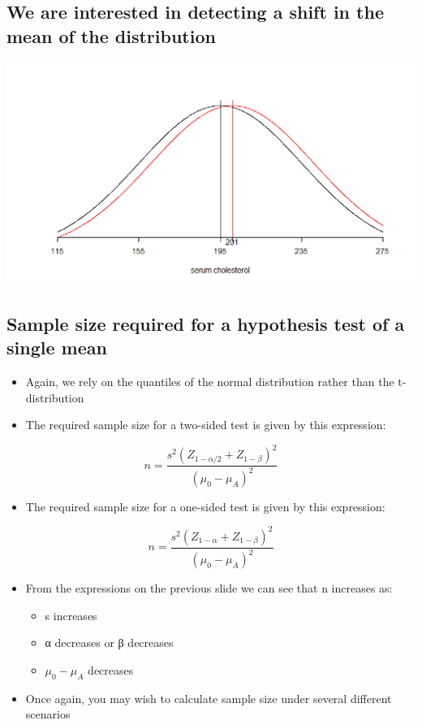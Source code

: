\documentclass[
]{book}
\providecommand{\tightlist}{%
  \setlength{\itemsep}{0pt}\setlength{\parskip}{0pt}}
\begin{document}
\hypertarget{we-are-interested-in-detecting-a-shift-in-the-mean-of-the-distribution}{%
\subsection{We are interested in detecting a shift in the mean of the distribution}\label{we-are-interested-in-detecting-a-shift-in-the-mean-of-the-distribution}}

\includegraphics[width=0.5\linewidth]{./4_55}

\hypertarget{sample-size-required-for-a-hypothesis-test-of-a-single-mean}{%
\subsection{Sample size required for a hypothesis test of a single mean}\label{sample-size-required-for-a-hypothesis-test-of-a-single-mean}}

\begin{itemize}
\tightlist
\item
  Again, we rely on the quantiles of the normal distribution rather than the t-distribution
\item
  The required sample size for a two-sided test is given by this expression:
\end{itemize}

\[n = \frac{s^2(Z_{1-\alpha/2}+Z_{1-\beta})^2}{(\mu_0-\mu_A)^2}\]

\begin{itemize}
\tightlist
\item
  The required sample size for a one-sided test is given by this expression:
\end{itemize}

\[n = \frac{s^2(Z_{1-\alpha}+Z_{1-\beta})^2}{(\mu_0-\mu_A)^2}\]

\begin{itemize}
\tightlist
\item
  From the expressions on the previous slide we can see that n increases as:

  \begin{itemize}
  \tightlist
  \item
    s increases
  \item
    α decreases or β decreases
  \item
    \(\mu_0-\mu_A\) decreases
  \end{itemize}
\item
  Once again, you may wish to calculate sample size under several different scenarios
\end{itemize}
\end{document}
